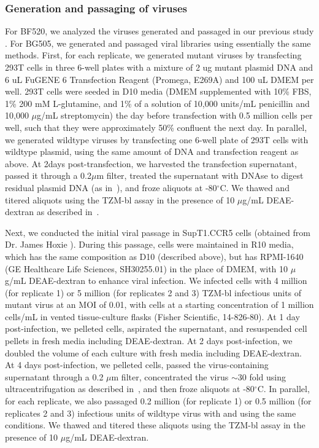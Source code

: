 \documentclass[9pt]{elife}
\begin{document}
\subsubsection*{Generation and passaging of viruses}
For BF520, we analyzed the viruses generated and passaged in our previous study \cite{dingens2017comprehensive}.
For BG505, we generated and passaged viral libraries using essentially the same methods.
First, for each replicate, we generated mutant viruses by transfecting 293T cells in three 6-well plates with a mixture of 2 ug mutant plasmid DNA and 6 uL FuGENE 6 Transfection Reagent (Promega, E269A) and 100 uL DMEM per well.
293T cells were seeded in D10 media (DMEM supplemented with 10\% FBS, 1\% 200 mM L-glutamine, and 1\% of a solution of 10,000 units/mL penicillin and 10,000 $\mu$g/mL streptomycin) the day before transfection with 0.5 million cells per well, such that they were approximately 50\% confluent the next day.
In parallel, we generated wildtype viruses by transfecting one 6-well plate of 293T cells with wildtype plasmid, using the same amount of DNA and transfection reagent as above.
At 2days post-transfection, we harvested the transfection supernatant, passed it through a 0.2$\mu$m filter, treated the supernatant with DNAse to digest residual plasmid DNA (as in~\cite{haddox2016experimental}), and froze aliquots at -80$^{\circ}$C.
We thawed and titered aliquots using the TZM-bl assay in the presence of 10 $\mu$g/mL DEAE-dextran as described in~\cite{dingens2017comprehensive}.

Next, we conducted the initial viral passage in SupT1.CCR5 cells (obtained from Dr. James Hoxie \cite{boyd2015mutations}).
During this passage, cells were maintained in R10 media, which has the same composition as D10 (described above), but has RPMI-1640 (GE Healthcare Life Sciences, SH30255.01) in the place of DMEM, with 10 $\mu$g/mL DEAE-dextran to enhance viral infection.
We infected cells with 4 million (for replicate 1) or 5 million (for replicates 2 and 3) TZM-bl infectious units of mutant virus at an MOI of 0.01, with cells at a starting concentration of 1 million cells/mL in vented tissue-culture flasks (Fisher Scientific, 14-826-80).
At 1 day post-infection, we pelleted cells, aspirated the supernatant, and resuspended cell pellets in fresh media including DEAE-dextran.
At 2 days post-infection, we doubled the volume of each culture with fresh media including DEAE-dextran.
At 4 days post-infection, we pelleted cells, passed the virus-containing supernatant through a 0.2 $\mu$m filter, concentrated the virus $\sim$30 fold using ultracentrifugation as described in~\cite{dingens2017comprehensive}, and then froze aliquots at -80$^{\circ}$C.
In parallel, for each replicate, we also passaged 0.2 million (for replicate 1) or 0.5 million (for replicates 2 and 3) infectious units of wildtype virus with and using the same conditions.
We thawed and titered these aliquots using the TZM-bl assay in the presence of 10 $\mu$g/mL DEAE-dextran.
\end{document}
